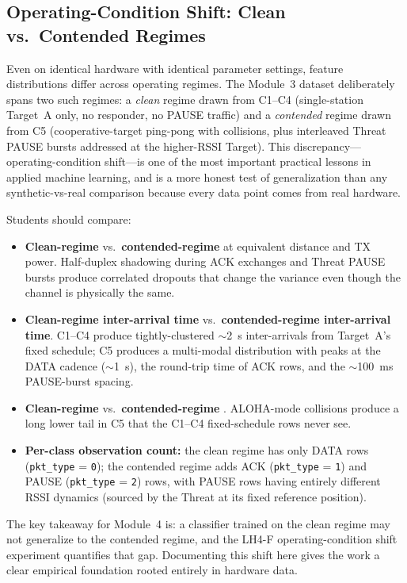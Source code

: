 \documentclass[11pt,letterpaper]{article}
\begin{document}
	\subsection{Operating-Condition Shift: Clean vs.\ Contended Regimes}

	\begin{tcolorbox}[infobox={Design Principle: Operating-Condition Shift as a Teaching Moment}]
		Even on identical hardware with identical parameter settings, feature distributions differ across operating regimes. The Module~3 dataset deliberately spans two such regimes: a \emph{clean} regime drawn from C1--C4 (single-station Target~A only, no responder, no PAUSE traffic) and a \emph{contended} regime drawn from C5 (cooperative-target ping-pong with collisions, plus interleaved Threat PAUSE bursts addressed at the higher-RSSI Target). This discrepancy---operating-condition shift---is one of the most important practical lessons in applied machine learning, and is a more honest test of generalization than any synthetic-vs-real comparison because every data point comes from real hardware.

		Students should compare:
		\begin{itemize}
			\item \textbf{Clean-regime \RSSI{}} vs.\ \textbf{contended-regime \RSSI{}} at equivalent distance and TX power. Half-duplex shadowing during ACK exchanges and Threat PAUSE bursts produce correlated dropouts that change the \RSSI{} variance even though the channel is physically the same.
			\item \textbf{Clean-regime inter-arrival time} vs.\ \textbf{contended-regime inter-arrival time}. C1--C4 produce tightly-clustered $\sim$2~s inter-arrivals from Target~A's fixed schedule; C5 produces a multi-modal distribution with peaks at the DATA cadence ($\sim$1~s), the round-trip time of ACK rows, and the $\sim$100~ms PAUSE-burst spacing.
			\item \textbf{Clean-regime \SNR{}} vs.\ \textbf{contended-regime \SNR{}}. ALOHA-mode collisions produce a long lower tail in C5 that the C1--C4 fixed-schedule rows never see.
			\item \textbf{Per-class observation count:} the clean regime has only DATA rows (\texttt{pkt\_type} = \texttt{0}); the contended regime adds ACK (\texttt{pkt\_type} = \texttt{1}) and PAUSE (\texttt{pkt\_type} = \texttt{2}) rows, with PAUSE rows having entirely different RSSI dynamics (sourced by the Threat at its fixed reference position).
		\end{itemize}

		The key takeaway for Module~4 is: a classifier trained on the clean regime may not generalize to the contended regime, and the LH4-F operating-condition shift experiment quantifies that gap. Documenting this shift here gives the \ML{} work a clear empirical foundation rooted entirely in hardware data.
	\end{tcolorbox}
\end{document}
